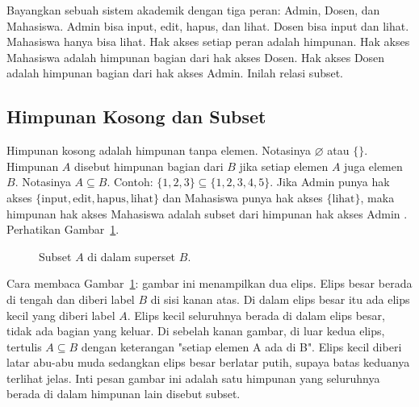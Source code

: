\documentclass[11pt,a4paper]{article}
\begin{document}
Bayangkan sebuah sistem akademik dengan tiga peran: Admin, Dosen, dan Mahasiswa. Admin bisa input, edit, hapus, dan lihat. Dosen bisa input dan lihat. Mahasiswa hanya bisa lihat. Hak akses setiap peran adalah himpunan. Hak akses Mahasiswa adalah himpunan bagian dari hak akses Dosen. Hak akses Dosen adalah himpunan bagian dari hak akses Admin. Inilah relasi subset.

\subsection{Himpunan Kosong dan Subset}

Himpunan kosong adalah himpunan tanpa elemen. Notasinya $\varnothing$ atau $\{\}$. Himpunan $A$ disebut himpunan bagian dari $B$ jika setiap elemen $A$ juga elemen $B$. Notasinya $A \subseteq B$. Contoh: $\{1,2,3\} \subseteq \{1,2,3,4,5\}$. Jika Admin punya hak akses $\{\text{input},\text{edit},\text{hapus},\text{lihat}\}$ dan Mahasiswa punya hak akses $\{\text{lihat}\}$, maka himpunan hak akses Mahasiswa adalah subset dari himpunan hak akses Admin \cite{lipschutz}. Perhatikan Gambar~\ref{fig:subset}.

\begin{figure}[H]
	\centering
	\caption{Subset $A$ di dalam superset $B$.}
	\label{fig:subset}
\end{figure}

Cara membaca Gambar~\ref{fig:subset}: gambar ini menampilkan dua elips. Elips besar berada di tengah dan diberi label $B$ di sisi kanan atas. Di dalam elips besar itu ada elips kecil yang diberi label $A$. Elips kecil seluruhnya berada di dalam elips besar, tidak ada bagian yang keluar. Di sebelah kanan gambar, di luar kedua elips, tertulis $A \subseteq B$ dengan keterangan "setiap elemen A ada di B". Elips kecil diberi latar abu-abu muda sedangkan elips besar berlatar putih, supaya batas keduanya terlihat jelas. Inti pesan gambar ini adalah satu himpunan yang seluruhnya berada di dalam himpunan lain disebut subset.
\end{document}
